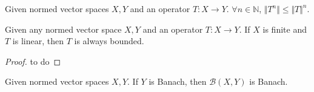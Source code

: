 \begin{corollary}
Given normed vector spaces $X, Y$ and an operator $T \colon X \to Y$. $\forall n \in \mathbb{N}$, $\Vert T^n \Vert \leq \Vert T \Vert^n$. 
\end{corollary}

\begin{theorem}
Given any normed vector space $X, Y$ and an operator $T \colon X \to Y$. If $X$ is finite and $T$ is linear, then $T$ is always bounded. 
\end{theorem}

\begin{proof}
to do
\end{proof}

\begin{theorem}
Given normed vector spaces $X, Y$. If $Y$ is Banach, then $\mathcal{B}(X, Y)$ is Banach. 
\end{theorem}

